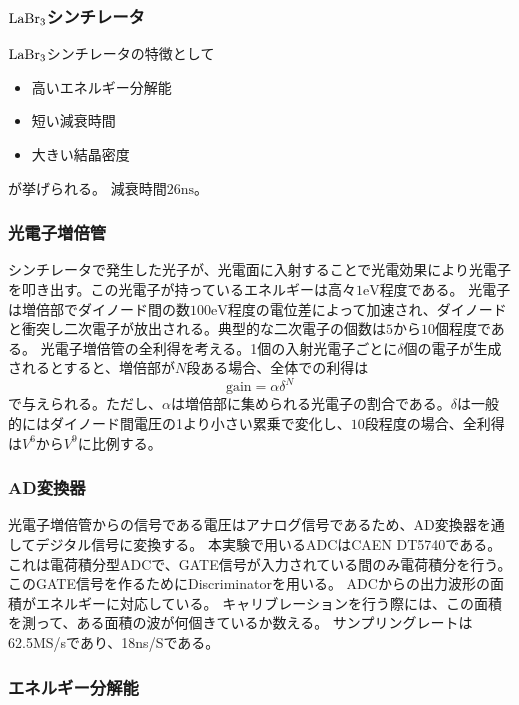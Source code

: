 \documentclass[dvipdfmx]{jreport}
\begin{document}
\subsubsection{$\ce{LaBr_{3}}$シンチレータ}
$\ce{LaBr_{3}}$シンチレータの特徴として
\begin{itemize}
\item 高いエネルギー分解能
\item 短い減衰時間
\item 大きい結晶密度
\end{itemize}
が挙げられる。
減衰時間$26\mathrm{ns}$。

\subsubsection{光電子増倍管}
シンチレータで発生した光子が、光電面に入射することで光電効果により光電子を叩き出す。この光電子が持っているエネルギーは高々$1\mathrm{eV}$程度である。
光電子は増倍部でダイノード間の数$100\mathrm{eV}$程度の電位差によって加速され、ダイノードと衝突し二次電子が放出される。典型的な二次電子の個数は$5$から$10$個程度である。
光電子増倍管の全利得を考える。1個の入射光電子ごとに$\delta$個の電子が生成されるとすると、増倍部が$N$段ある場合、全体での利得は
\begin{equation}
  \mathrm{gain} = \alpha \delta^{N}
\end{equation}
で与えられる。ただし、$\alpha$は増倍部に集められる光電子の割合である。$\delta$は一般的にはダイノード間電圧の1より小さい累乗で変化し、$10$段程度の場合、全利得は$V^{6}$から$V^{9}$に比例する。

\subsubsection{AD変換器}
光電子増倍管からの信号である電圧はアナログ信号であるため、AD変換器を通してデジタル信号に変換する。
本実験で用いるADCはCAEN DT5740である。これは電荷積分型ADCで、GATE信号が入力されている間のみ電荷積分を行う。このGATE信号を作るためにDiscriminatorを用いる。
ADCからの出力波形の面積がエネルギーに対応している。
キャリブレーションを行う際には、この面積を測って、ある面積の波が何個きているか数える。
サンプリングレートは62.5MS/sであり、18ns/Sである。

\subsubsection{エネルギー分解能}
\end{document}
